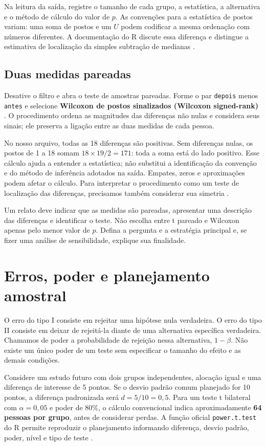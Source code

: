 Na leitura da saída, registre o tamanho de cada grupo, a estatística, a alternativa e o método de cálculo do valor de $p$. As convenções para a estatística de postos variam: uma soma de postos e um $U$ podem codificar a mesma ordenação com números diferentes. A documentação do R discute essa diferença e distingue a estimativa de localização da simples subtração de medianas \parencite{RWilcoxon}.

\subsection{Duas medidas pareadas}

Desative o filtro e abra o teste de amostras pareadas. Forme o par \texttt{depois} menos \texttt{antes} e selecione \textbf{Wilcoxon de postos sinalizados (Wilcoxon signed-rank)} \parencite{JamoviTPareado}. O procedimento ordena as magnitudes das diferenças não nulas e considera seus sinais; ele preserva a ligação entre as duas medidas de cada pessoa.

No nosso arquivo, todas as 18 diferenças são positivas. Sem diferenças nulas, os postos de 1 a 18 somam $18\times19/2=171$: toda a soma está do lado positivo. Esse cálculo ajuda a entender a estatística; não substitui a identificação da convenção e do método de inferência adotados na saída. Empates, zeros e aproximações podem afetar o cálculo. Para interpretar o procedimento como um teste de localização das diferenças, precisamos também considerar sua simetria \parencite{RWilcoxon}.

Um relato deve indicar que as medidas são pareadas, apresentar uma descrição das diferenças e identificar o teste. Não escolha entre t pareado e Wilcoxon apenas pelo menor valor de $p$. Defina a pergunta e a estratégia principal e, se fizer uma análise de sensibilidade, explique sua finalidade.

\section{Erros, poder e planejamento amostral}

O erro do tipo I consiste em rejeitar uma hipótese nula verdadeira. O erro do tipo II consiste em deixar de rejeitá-la diante de uma alternativa específica verdadeira. Chamamos de poder a probabilidade de rejeição nessa alternativa, $1-\beta$. Não existe um único poder de um teste sem especificar o tamanho do efeito e as demais condições.

Considere um estudo futuro com dois grupos independentes, alocação igual e uma diferença de interesse de 5 pontos. Se o desvio padrão comum planejado for 10 pontos, a diferença padronizada será $d=5/10=0{,}5$. Para um teste t bilateral com $\alpha=0{,}05$ e poder de 80\%, o cálculo convencional indica aproximadamente \textbf{64 pessoas por grupo}, antes de considerar perdas. A função oficial \texttt{power.t.test} do R permite reproduzir o planejamento informando diferença, desvio padrão, poder, nível e tipo de teste \parencite{RPoderT}.

